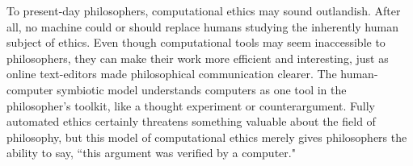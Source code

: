 \begin{isabellebody}
\begin{isamarkuptext}
To present-day philosophers, computational ethics may sound outlandish. After all, no machine could 
or should replace humans studying the inherently human subject of ethics. Even though computational
tools may seem inaccessible to philosophers, they can make their work more efficient and interesting, 
just as online text-editors made philosophical communication clearer. The human-computer symbiotic model
understands computers as one tool in the philosopher's toolkit, like a thought experiment or counterargument.
Fully automated ethics certainly threatens something valuable about the field of philosophy, but
this model of computational ethics merely gives philosophers the ability to say, ``this argument was
verified by a computer."%
\end{isamarkuptext}\isamarkuptrue%
%
\isadelimtheory
%
\endisadelimtheory
%
\isatagtheory
%
\endisatagtheory
{\isafoldtheory}%
%
\isadelimtheory
%
\endisadelimtheory
%
\end{isabellebody}%
\endinput

